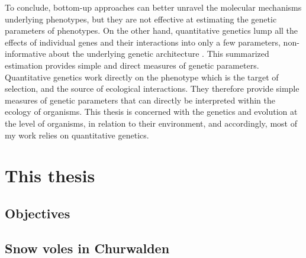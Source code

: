 To conclude, bottom-up approaches can better unravel the molecular mechanisms underlying phenotypes, but they are not effective at estimating the genetic parameters of phenotypes. On the other hand, quantitative genetics lump all the effects of individual genes and their interactions into only a few parameters, non-informative about the underlying genetic architecture \parencite{Mackay2001,Nietlisbach2015,Huang041434}.  This summarized estimation provides simple and direct measures of genetic parameters. Quantitative genetics work directly on the phenotype which is the target of selection, and the source of ecological interactions. They therefore provide simple measures of genetic parameters that can directly be interpreted within the ecology of organisms.
This thesis is concerned with the genetics and evolution at the level of organisms, in relation to their environment, and accordingly, most of my work relies on quantitative genetics.



\section{This thesis}

\subsection{Objectives}




\subsection{Snow voles in Churwalden}

